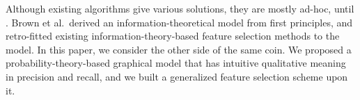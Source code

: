 Although existing algorithms give various solutions, they are mostly
ad-hoc, until \cite{brown2012conditional}. Brown et al.\ derived an
information-theoretical model from first principles, and retro-fitted
existing information-theory-based feature selection methods to the
model. In this paper, we consider the other side of the same coin. We
proposed a probability-theory-based graphical model that has intuitive
qualitative meaning in precision and recall, and we built a
generalized feature selection scheme upon it.


